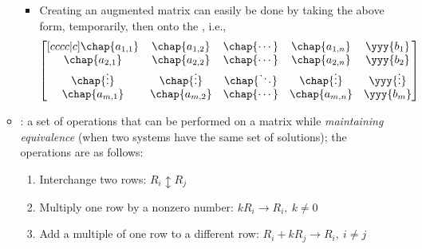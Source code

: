 \begin{itemize}
\begin{itemize}
\begin{itemize}
        \item Creating an augmented matrix can easily be done by taking the above form,  temporarily, then  onto the , i.e.,
      \[%
      \begin{bmatrix}[cccc|c]
        \chap{a_{1,1}} & \chap{a_{1,2}} & \chap{\cdots} & \chap{a_{1,n}} & \yyy{b_1}\\
        \chap{a_{2,1}} & \chap{a_{2,2}} & \chap{\cdots} & \chap{a_{2,n}} & \yyy{b_2}\\
        \chap{\vdots} & \chap{\vdots} & \chap{\ddots} & \chap{\vdots} & \yyy{\vdots} \\
        \chap{a_{m,1}} & \chap{a_{m,2}} & \chap{\cdots} & \chap{a_{m,n}} & \yyy{b_m}
        \end{bmatrix}
      \]%
      \end{itemize} 
    \item {}: a set of operations that can be performed on a matrix while \emph{maintaining equivalence} (when two systems have the same set of solutions); the operations are as follows:
      \begin{enumerate}
        \item Interchange two rows: \emph{\(R_i \updownarrow R_j\)}
        \item Multiply one row by a nonzero number: \emph{\(kR_i \rightarrow R_i,~k\neq 0\)}
        \item Add a multiple of one row to a different row: \emph{\(R_i + kR_j \rightarrow R_i,~i\neq j\)}
      \end{enumerate}
  \end{itemize}
\end{itemize}

\newpage
